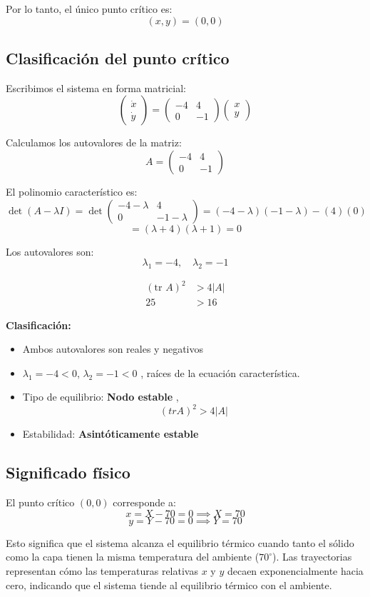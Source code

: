\documentclass{article}
\begin{document}
Por lo tanto, el único punto crítico es:
\[
(x, y) = (0, 0)
\]

\subsection{Clasificación del punto crítico}

Escribimos el sistema en forma matricial:
\[
\begin{pmatrix}
\dot{x} \\ \dot{y}
\end{pmatrix}
=
\begin{pmatrix}
-4 & 4 \\
0 & -1
\end{pmatrix}
\begin{pmatrix}
x \\ y
\end{pmatrix}
\]

Calculamos los autovalores de la matriz:
\[
A = \begin{pmatrix}
-4 & 4 \\
0 & -1
\end{pmatrix}
\]

El polinomio característico es:
\[
\det(A - \lambda I) = \det\begin{pmatrix}
-4-\lambda & 4 \\
0 & -1-\lambda
\end{pmatrix} = (-4-\lambda)(-1-\lambda) - (4)(0)
\]
\[
= (\lambda + 4)(\lambda + 1) = 0
\]

Los autovalores son:
\[
\lambda_1 = -4, \quad \lambda_2 = -1
\]

\begin{align}
    (\text{tr } A)^{2} &> 4 |A| \\
    25 &> 16
\end{align}


\textbf{Clasificación:}
\begin{itemize}
    \item Ambos autovalores son reales y negativos
    \item $\lambda_1 = -4 < 0$, $\lambda_2 = -1 < 0$ , raíces de la ecuación característica.
    \item Tipo de equilibrio: \textbf{Nodo estable} , \[(tr A)^2 > 4 |A| \]
    \item Estabilidad: \textbf{Asintóticamente estable}
\end{itemize}

\subsection{Significado físico}

El punto crítico $(0, 0)$ corresponde a:
\[
x = X - 70 = 0 \implies X = 70
\]
\[
y = Y - 70 = 0 \implies Y = 70
\]

Esto significa que el sistema alcanza el equilibrio térmico cuando tanto el sólido como la capa tienen la misma temperatura del ambiente ($70^\circ$). Las trayectorias representan cómo las temperaturas relativas $x$ y $y$ decaen exponencialmente hacia cero, indicando que el sistema tiende al equilibrio térmico con el ambiente.
\end{document}
